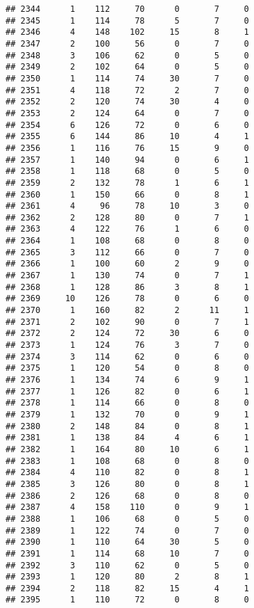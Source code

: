 \documentclass[
]{article}
\begin{document}
\begin{verbatim}
## 2344      1    112     70      0       7     0
## 2345      1    114     78      5       7     0
## 2346      4    148    102     15       8     1
## 2347      2    100     56      0       7     0
## 2348      3    106     62      0       5     0
## 2349      2    102     64      0       5     0
## 2350      1    114     74     30       7     0
## 2351      4    118     72      2       7     0
## 2352      2    120     74     30       4     0
## 2353      2    124     64      0       7     0
## 2354      6    126     72      0       6     0
## 2355      6    144     86     10       4     1
## 2356      1    116     76     15       9     0
## 2357      1    140     94      0       6     1
## 2358      1    118     68      0       5     0
## 2359      2    132     78      1       6     1
## 2360      1    150     66      0       8     1
## 2361      4     96     78     10       3     0
## 2362      2    128     80      0       7     1
## 2363      4    122     76      1       6     0
## 2364      1    108     68      0       8     0
## 2365      3    112     66      0       7     0
## 2366      1    100     60      2       9     0
## 2367      1    130     74      0       7     1
## 2368      1    128     86      3       8     1
## 2369     10    126     78      0       6     0
## 2370      1    160     82      2      11     1
## 2371      2    102     90      0       7     1
## 2372      2    124     72     30       6     0
## 2373      1    124     76      3       7     0
## 2374      3    114     62      0       6     0
## 2375      1    120     54      0       8     0
## 2376      1    134     74      6       9     1
## 2377      1    126     82      0       6     1
## 2378      1    114     66      0       8     0
## 2379      1    132     70      0       9     1
## 2380      2    148     84      0       8     1
## 2381      1    138     84      4       6     1
## 2382      1    164     80     10       6     1
## 2383      1    108     68      0       8     0
## 2384      4    110     82      0       8     1
## 2385      3    126     80      0       8     1
## 2386      2    126     68      0       8     0
## 2387      4    158    110      0       9     1
## 2388      1    106     68      0       5     0
## 2389      1    122     74      0       7     0
## 2390      1    110     64     30       5     0
## 2391      1    114     68     10       7     0
## 2392      3    110     62      0       5     0
## 2393      1    120     80      2       8     1
## 2394      2    118     82     15       4     1
## 2395      1    110     72      0       8     0

\end{verbatim}
\end{document}
